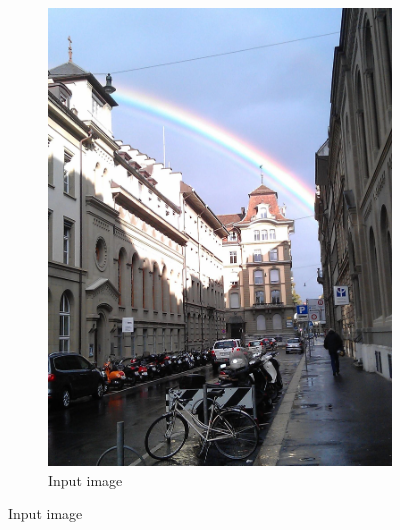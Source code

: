 \documentclass[a4paper]{article}
\begin{document}
\begin{figure}[ht]
	\centering
	\begin{subfigure}[h]{0.48\textwidth}
		\centering
		\includegraphics[width=\textwidth]{rainbow}
		\caption*{Input image}
	\end{subfigure}
	

\end{figure}
\end{document}
